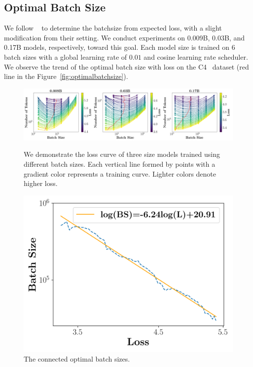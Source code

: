 \subsection{Optimal Batch Size}
We follow ~\cite{kaplan2020scaling} to determine the batchsize from expected loss, with a slight modification from their setting. We conduct experiments on 0.009B, 0.03B, and 0.17B models, respectively, toward this goal. Each model size is trained on 6 batch sizes with a global learning rate of $0.01$ and cosine learning rate scheduler. We observe the trend of the optimal batch size with loss on the C4~\citep{2019t5} dataset (red line in the Figure~\ref{fig:optimalbatchsize}).

\begin{figure}[!htbp]
    \centering
    \begin{minipage}{0.66\textwidth}
        \centering
        \includegraphics[width=\linewidth]{Fig/batch_size_1.png}
    \caption{We demonstrate the loss curve of three size models trained using different batch sizes. Each vertical line formed by points with a gradient color represents a training curve. Lighter colors denote higher loss.}
    \label{fig:optimalbatchsize}
    \end{minipage}
    \begin{minipage}{0.3\textwidth}
        \centering
        \includegraphics[width=\linewidth]{Fig/batch_size_2.png}
        \caption{The connected optimal batch sizes. }
        \label{fig:optimalbatchsizeconnect}
    \end{minipage}
\end{figure}

